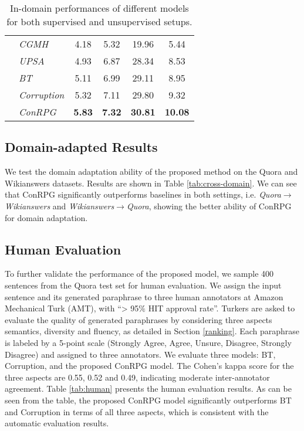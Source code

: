 \documentclass[11pt,a4paper]{article}
\begin{document}
\begin{table}[!t]
{\begin{tabular}{clcccc}
    & {\it CGMH} & 4.18& 5.32& 19.96 &5.44\\
    & {\it UPSA} &  4.93& 6.87 &28.34 &8.53 \\
    & {\it BT} &5.11  & 6.99 &29.11  &8.95 \\
     & {\it Corruption} & 5.32 & 7.11 & 29.80 & 9.32 \\
    & {\it ConRPG} & {\bf 5.83} & {\bf 7.32} & {\bf 30.81} & {\bf 10.08}\\\bottomrule
  \end{tabular}
  }
  \caption{In-domain performances of different models for both supervised and unsupervised setups. }
  \label{tab:in-domain}
\end{table}
\subsection{Domain-adapted Results}
We test the domain adaptation ability of the proposed method on the Quora and Wikianswers datasets.
Results are shown in Table \ref{tab:cross-domain}. We can see that ConRPG significantly outperforms baselines in both settings, i.e. {\it Quora$\rightarrow$Wikianswers} and {\it Wikianswers$\rightarrow$Quora}, showing the better ability of ConRPG for domain adaptation. 
\subsection{Human Evaluation}
To further validate the performance of the proposed model, we sample 400  
sentences from the Quora test set for human evaluation.
We assign the input sentence and its generated paraphrase to  three human annotators at 
Amazon Mechanical Turk (AMT), with “> 95$\%$ HIT approval rate”.
Turkers are asked to  evaluate the  quality of
generated paraphrases by considering three aspects 
semantics, diversity and fluency, as detailed in Section \ref{ranking}. 
Each paraphrase is labeled 
 by a
5-point scale (Strongly Agree, Agree, Unsure, Disagree, Strongly Disagree) and assigned to three annotators.
We evaluate three models: 
BT,  Corruption, and the proposed ConRPG model. 
The  Cohen's kappa score \citep{mchugh2012interrater} for the three aspects are 0.55, 0.52 and 0.49, indicating moderate inter-annotator agreement. 
Table \ref{tab:human} presents the human evaluation results. As can be seen from the table, the proposed ConRPG model significantly outperforms BT and Corruption in terms of all three aspects, which is consistent with the automatic evaluation results. 
\end{document}
